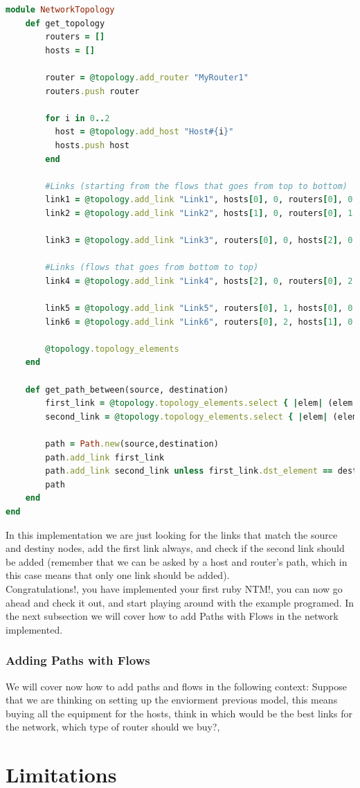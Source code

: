 \begin{lstlisting}[language=Ruby,breaklines=true]
module NetworkTopology
	def get_topology
		routers = []
        hosts = []

        router = @topology.add_router "MyRouter1"
        routers.push router

        for i in 0..2  
          host = @topology.add_host "Host#{i}"
          hosts.push host     
        end
        
        #Links (starting from the flows that goes from top to bottom)    
        link1 = @topology.add_link "Link1", hosts[0], 0, routers[0], 0
        link2 = @topology.add_link "Link2", hosts[1], 0, routers[0], 1

        link3 = @topology.add_link "Link3", routers[0], 0, hosts[2], 0

        #Links (flows that goes from bottom to top)    
        link4 = @topology.add_link "Link4", hosts[2], 0, routers[0], 2

        link5 = @topology.add_link "Link5", routers[0], 1, hosts[0], 0
        link6 = @topology.add_link "Link6", routers[0], 2, hosts[1], 0
        
        @topology.topology_elements
	end
    
    def get_path_between(source, destination)
    	first_link = @topology.topology_elements.select { |elem| (elem.is_a? Link) && (elem.src_element == source) }.first
        second_link = @topology.topology_elements.select { |elem| (elem.is_a? Link) && (elem.dst_element == destination) }.first

        path = Path.new(source,destination)        
        path.add_link first_link
        path.add_link second_link unless first_link.dst_element == destination
        path
    end
end
\end{lstlisting}

In this implementation we are just looking for the links that match the source and destiny nodes, add the first link always, and check if the second link should be added (remember that we can be asked by a host and router's path, which in this case means that only one link should be added). \\

Congratulations!, you have implemented your first ruby NTM!, you can now go ahead and check it out, and start playing around with the example programed. In the next subsection we will cover how to add Paths with Flows in the network implemented.

\subsubsection{Adding Paths with Flows}

We will cover now how to add paths and flows in the following context: Suppose that we are thinking on setting up the enviorment previous model, this means buying all the equipment for the hosts, think in which would be the best links for the network, which type of router should we buy?, 

\section{Limitations}